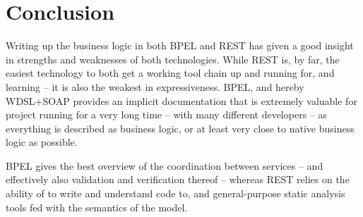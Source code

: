\chapter{Conclusion}
Writing up the business logic in both BPEL and REST has given a good insight in strengths and weaknesses of both technologies. While REST is, by far, the easiest technology to both get a working tool chain up and running for, and learning -- it is also the weakest in expressiveness.  BPEL, and hereby WDSL+SOAP provides an implicit documentation that is extremely valuable for project running for a very long time -- with many different developers -- as everything is described as business logic, or at least very close to native business logic as possible.

BPEL gives the best overview of the coordination between services -- and effectively also validation and verification thereof -- whereas REST relies on the ability of to write and understand code to, and general-purpose static analysis tools fed with the semantics of the model.
